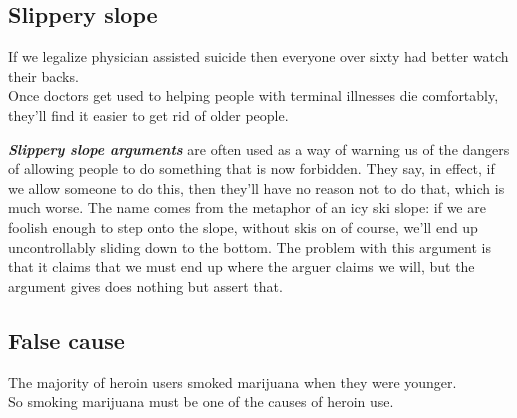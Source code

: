 \documentclass[
  12pt, openany]{book}
\theoremstyle{definition}
\theoremstyle{definition}
\theoremstyle{definition}
\theoremstyle{remark}
\begin{document}
\hypertarget{slippery-slope}{%
\subsection*{Slippery slope}\label{slippery-slope}}


\begin{center}

\begin{argument}

If we legalize physician assisted suicide then everyone over sixty had better watch their backs.\\

Once doctors get used to helping people with terminal illnesses die comfortably, they'll find it easier to get rid of older people.

\end{argument}

\end{center}

\textbf{\emph{Slippery slope arguments}} are often used as a way of warning us of the dangers of allowing people to do something that is now forbidden. They say, in effect, if we allow someone to do this, then they'll have no reason not to do that, which is much worse. The name comes from the metaphor of an icy ski slope: if we are foolish enough to step onto the slope, without skis on of course, we'll end up uncontrollably sliding down to the bottom. The problem with this argument is that it claims that we must end up where the arguer claims we will, but the argument gives does nothing but assert that.

\hypertarget{false-cause}{%
\subsection*{False cause}\label{false-cause}}


\begin{center}

\begin{argument}

The majority of heroin users smoked marijuana when they were younger.\\
So smoking marijuana must be one of the causes of heroin use.

\end{argument}

\end{center}
\end{document}
